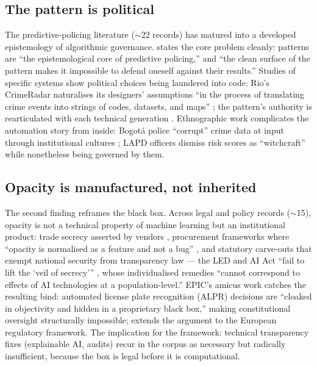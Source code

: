 \subsection{The pattern is political}

The predictive-policing literature ($\sim$22 records) has matured into a developed epistemology of algorithmic governance. \textcite[pp.~675,690]{kaufmann2019} states the core problem cleanly: patterns are ``the epistemological core of predictive policing,'' and ``the clean surface of the pattern makes it impossible to defend oneself against their results.'' Studies of specific systems show political choices being laundered into code: Rio's CrimeRadar naturalises its designers' assumptions ``in the process of translating crime events into strings of codes, datasets, and maps'' \parencite[p.~203]{duarte2021}; the pattern's authority is rearticulated with each technical generation \parencite{halterlein2021}. Ethnographic work complicates the automation story from inside: Bogotá police ``corrupt'' crime data at input through institutional cultures \parencite[p.~347]{barreneche2019}; LAPD officers dismiss risk scores as ``witchcraft'' \parencite[p.~87]{brayne2020} while nonetheless being governed by them.

\subsection{Opacity is manufactured, not inherited}

The second finding reframes the black box. Across legal and policy records ($\sim$15), opacity is not a technical property of machine learning but an institutional product: trade secrecy asserted by vendors \parencite{brayne2020}, procurement frameworks where ``opacity is normalised as a feature and not a bug'' \parencite[p.~9]{article19_2022}, and statutory carve-outs that exempt national security from transparency law — the LED and AI Act ``fail to lift the `veil of secrecy''' \parencite[p.~22]{erdogan2024}, whose individualised remedies ``cannot correspond to effects of AI technologies at a population-level.'' EPIC's amicus work \parencite[p.~24]{epic2026} catches the resulting bind: automated license plate recognition (ALPR) decisions are ``cloaked in objectivity and hidden in a proprietary black box,'' making constitutional oversight structurally impossible; \textcite{erdogan2024} extends the argument to the European regulatory framework. The implication for the framework: technical transparency fixes (explainable AI, audits) recur in the corpus as necessary but radically insufficient, because the box is legal before it is computational.

